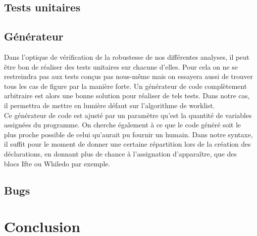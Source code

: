 \documentclass[a4paper, 12pt]{article}
\begin{document}
\subsection{Tests unitaires}
\subsection{Générateur}
Dans l'optique de vérification de la robustesse de nos différentes analyses, il peut être bon de réaliser
des tests unitaires sur chacune d'elles. Pour cela on ne se restreindra pas aux tests conçus pas nous-même
mais on essayera aussi de trouver tous les cas de figure par la manière forte. Un générateur de code complètement
arbitraire est alors une bonne solution pour réaliser de tels tests. Dans notre cas, il permettra de mettre en
lumière défaut sur l'algorithme de worklist.
\\
Ce générateur de code est ajusté par un paramètre qu'est la quantité de variables assignées du programme. On
cherche également à ce que le code généré soit le plus proche possible de celui qu'aurait pu fournir un humain.
Dans notre syntaxe, il suffit pour le moment de donner une certaine répartition lors de la création des déclarations,
en donnant plus de chance à l'assignation d'apparaître, que des blocs Ifte ou Whiledo par exemple.
\subsection{Bugs}
\section{Conclusion}
\end{document}
